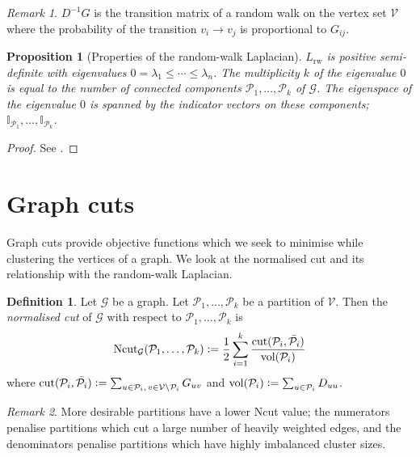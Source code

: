 \documentclass[12pt,draft]{ociamthesis}
\theoremstyle{plain}
\newtheorem{proposition}{Proposition}[chapter]
\theoremstyle{definition}
\newtheorem{definition}{Definition}[chapter]
\theoremstyle{remark}
\newtheorem*{remark}{Remark}
\newcommand\bb[1]{\mathbb{#1}}
\newcommand\ca[1]{\mathcal{#1}}
\begin{document}
\begin{remark}
  $D^{-1} G$ is the transition matrix of a random walk on the vertex set
  $\ca{V}$
  where the probability of the transition $v_i \to v_j$ is proportional to
  $G_{i j}$.
\end{remark}

\begin{proposition}[Properties of the random-walk Laplacian]
  \label{prop:laplacian}
  $L_\mathrm{rw}$ is positive semi-definite with eigenvalues $0 = \lambda_1 \leq
  \cdots \leq \lambda_n$.
  The multiplicity $k$ of the eigenvalue $0$ is equal to the number of connected
  components $\ca{P}_1, \ldots, \ca{P}_k$ of $\ca{G}$.
  The eigenspace of the eigenvalue $0$ is spanned by the indicator vectors on
  these components; $ \bb{I}_{\ca{P}_1}, \ldots, \bb{I}_{\ca{P}_k} $.
\end{proposition}

\begin{proof}
  See \cite{von2007tutorial}.
\end{proof}

\section{Graph cuts} \label{sec:spectral_graph_cut}

Graph cuts provide objective functions which we seek to minimise while
clustering the vertices of a graph.
We look at the normalised cut and its relationship with the random-walk
Laplacian.

\begin{definition}
  Let $\ca{G}$ be a graph. Let $ \ca{P}_1, \ldots, \ca{P}_k $ be a partition of
  $\ca{V}$. Then the \emph{normalised cut} \cite{shi2000normalized} of $\ca{G}$
  with respect to $ \ca{P}_1, \ldots, \ca{P}_k $ is
  $$ \mathrm{Ncut}_\ca{G}(\ca{P}_1, \ldots, \ca{P}_k) \vcentcolon= \frac{1}{2}
  \sum_{i=1}^k
  \frac{ \mathrm{cut}(\ca{P}_i,\bar{\ca{P}_i}) }{ \mathrm{vol}(\ca{P}_i) } $$
  where $ \mathrm{cut}(\ca{P}_i,\bar{\ca{P}_i})
  \vcentcolon= \sum_{u \in \ca{P}_i, \, v \in \ca{V} \setminus \ca{P}_i}
  G_{u v}$
  and $\mathrm{vol}(\ca{P}_i) \vcentcolon= \sum_{u \in \ca{P}_i} D_{u u}$.

\end{definition}

\begin{remark}
  More desirable partitions have a lower Ncut value; the numerators penalise
  partitions which cut a large number of heavily weighted edges, and the
  denominators penalise partitions which have highly imbalanced cluster sizes.
\end{remark}
\end{document}
